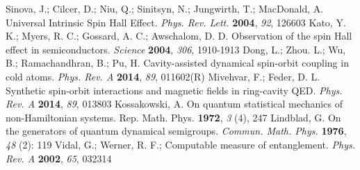 \documentclass[atoms,article,submit,moreauthors,pdftex,12pt,a4paper]{mdpi}
\begin{document}
\begin{thebibliography}{999}
Sinova, J.; Cilcer, D.; Niu, Q.; Sinitsyn, N.; Jungwirth, T.; MacDonald, A. Universal Intrinsic Spin Hall Effect. {\em Phys. Rev. Lett.} {\bf 2004}, {\em 92}, 126603
Kato, Y. K.; Myers, R. C.; Gossard, A. C.; Awschalom, D. D. Observation of the spin Hall effect in semiconductors. {\em Science} {\bf 2004}, {\em 306}, 1910-1913
Dong, L.; Zhou. L.; Wu, B.; Ramachandhran, B.; Pu, H. Cavity-assisted dynamical spin-orbit coupling in cold atoms. {\em Phys. Rev. A} {\bf 2014}, {\em 89}, 011602(R)
Mivehvar, F.; Feder, D. L. Synthetic spin-orbit interactions and magnetic fields in ring-cavity QED. {\em Phys. Rev. A} {\bf 2014}, {\em 89}, 013803
Kossakowski, A. On quantum statistical mechanics of non-Hamiltonian systems. {Rep. Math. Phys.} {\bf 1972}, {\em 3} (4), 247
Lindblad, G. On the generators of quantum dynamical semigroups. {\em Commun. Math. Phys.} {\bf 1976}, {\em 48} (2): 119
Vidal, G.; Werner, R. F.; Computable measure of entanglement. {\em Phys. Rev. A} {\bf 2002}, {\em 65}, 032314
\end{thebibliography}
\end{document}

